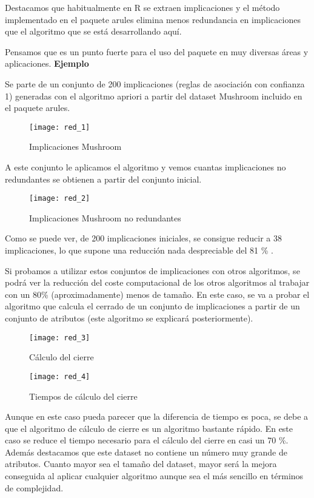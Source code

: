 Destacamos que habitualmente en R se extraen implicaciones y el m\'etodo implementado en el paquete arules elimina menos redundancia en implicaciones que el algoritmo que se est\'a desarrollando aqu\'i. 

Pensamos que es un punto fuerte para el uso del paquete en muy diversas \'areas y aplicaciones. 
\newpage
\textbf{Ejemplo}

Se parte de un conjunto de 200 implicaciones (reglas de asociaci\'on con confianza 1) generadas con el algoritmo apriori a partir del dataset Mushroom incluido en el paquete arules.

\begin{figure}[H]
    \centering
    \texttt{[image: red\_1]}
    \caption{Implicaciones Mushroom}
    \label{fig:red_1}
\end{figure} 
\newpage
A este conjunto le aplicamos el algoritmo y vemos cuantas implicaciones no redundantes se obtienen a partir del conjunto inicial.

\begin{figure}[H]
    \centering
    \texttt{[image: red\_2]}
    \caption{Implicaciones Mushroom no redundantes}
    \label{fig:red_2}
\end{figure} 

Como se puede ver, de 200 implicaciones iniciales, se consigue reducir a 38 implicaciones, lo que supone una reducci\'on nada despreciable del 81 \% .

Si probamos a utilizar estos conjuntos de implicaciones con otros algoritmos, se podr\'a ver la reducci\'on del coste computacional de los otros algoritmos al trabajar con un 80\% (aproximadamente) menos de tama\~no. En este caso, se va a probar el algoritmo que calcula el cerrado de un conjunto de implicaciones a partir de un conjunto de atributos (este algoritmo se explicar\'a posteriormente).

\begin{figure}[H]
    \centering
    \texttt{[image: red\_3]}
    \caption{C\'alculo del cierre}
    \label{fig:red_3}
\end{figure}

\begin{figure}[H]
    \centering
    \texttt{[image: red\_4]}
    \caption{Tiempos de c\'alculo del cierre}
    \label{fig:red_4}
\end{figure}

Aunque en este caso pueda parecer que la diferencia de tiempo es poca, se debe a que el algoritmo de c\'alculo de cierre es un algoritmo bastante r\'apido. En este caso se reduce el tiempo necesario para el c\'alculo del cierre en casi un 70 \%. Adem\'as destacamos que este dataset no contiene un n\'umero muy grande de atributos. Cuanto mayor sea el tama\~no del dataset, mayor ser\'a la mejora conseguida al aplicar cualquier algoritmo aunque sea el m\'as sencillo en t\'erminos de complejidad. 

